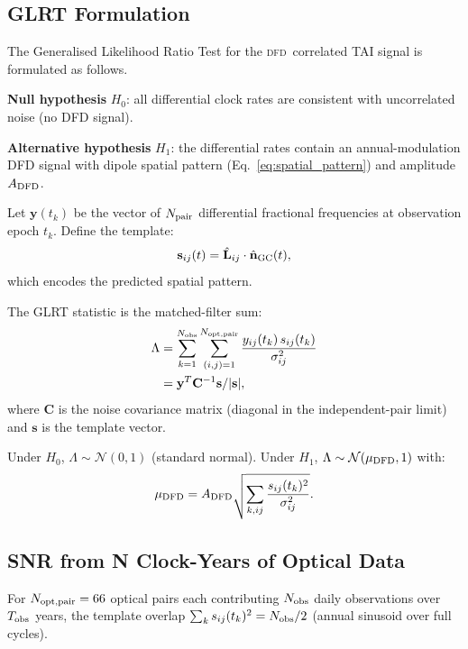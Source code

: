 \documentclass[aps,prd,twocolumn,superscriptaddress,nofootinbib]{revtex4-2}
\newcommand{\DFD}{\textsc{dfd}}
\begin{document}
\subsection{GLRT Formulation}
\label{subsec:glrt}

The Generalised Likelihood Ratio Test for the \DFD\ correlated TAI signal
is formulated as follows.

\textbf{Null hypothesis} $H_0$: all differential clock rates are consistent
with uncorrelated noise (no DFD signal).

\textbf{Alternative hypothesis} $H_1$: the differential rates contain an
annual-modulation DFD signal with dipole spatial pattern
(Eq.~\ref{eq:spatial_pattern}) and amplitude $A_{\rm DFD}$.

Let $\mathbf{y}(t_k)$ be the vector of $N_{\rm pair}$ differential fractional
frequencies at observation epoch $t_k$. Define the template:
\begin{equation}
\mathbf{s}_{ij}(t) = \hat{\mathbf{L}}_{ij}\cdot\hat{\mathbf{n}}_{\rm GC}(t),
\label{eq:template}
\end{equation}
which encodes the predicted spatial pattern.

The GLRT statistic is the matched-filter sum:
\begin{align}
\Lambda &= \sum_{k=1}^{N_{\rm obs}} \sum_{(i,j)=1}^{N_{\rm opt,pair}}
  \frac{y_{ij}(t_k)\,s_{ij}(t_k)}{\sigma_{ij}^2} \nonumber\\
&= \mathbf{y}^T \mathbf{C}^{-1} \mathbf{s} / |\mathbf{s}|,
\label{eq:glrt}
\end{align}
where $\mathbf{C}$ is the noise covariance matrix (diagonal in the
independent-pair limit) and $\mathbf{s}$ is the template vector.

Under $H_0$, $\Lambda \sim \mathcal{N}(0, 1)$ (standard normal).
Under $H_1$, $\Lambda \sim \mathcal{N}(\mu_{\rm DFD}, 1)$ with:
\begin{equation}
\mu_{\rm DFD} = A_{\rm DFD}\sqrt{\sum_{k,ij}
  \frac{s_{ij}(t_k)^2}{\sigma_{ij}^2}}.
\label{eq:mu_glrt}
\end{equation}

\subsection{SNR from N Clock-Years of Optical Data}

For $N_{\rm opt,pair} = 66$ optical pairs each contributing $N_{\rm obs}$ daily
observations over $T_{\rm obs}$ years, the template overlap
$\sum_k s_{ij}(t_k)^2 = N_{\rm obs}/2$ (annual sinusoid over full cycles).
\end{document}
